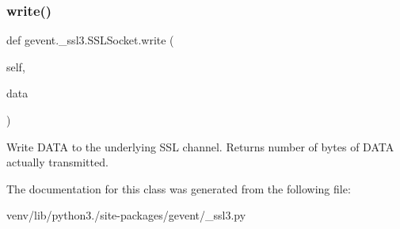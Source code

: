 \subsubsection{\texorpdfstring{write()}{write()}}
{\footnotesize\ttfamily def gevent.\+\_\+ssl3.\+S\+S\+L\+Socket.\+write (\begin{DoxyParamCaption}\item[{}]{self,  }\item[{}]{data }\end{DoxyParamCaption})}

\begin{DoxyVerb}Write DATA to the underlying SSL channel.  Returns
number of bytes of DATA actually transmitted.\end{DoxyVerb}
 

The documentation for this class was generated from the following file\+:\begin{DoxyCompactItemize}
\item 
venv/lib/python3./site-\/packages/gevent/\+\_\+ssl3.\+py\end{DoxyCompactItemize}
